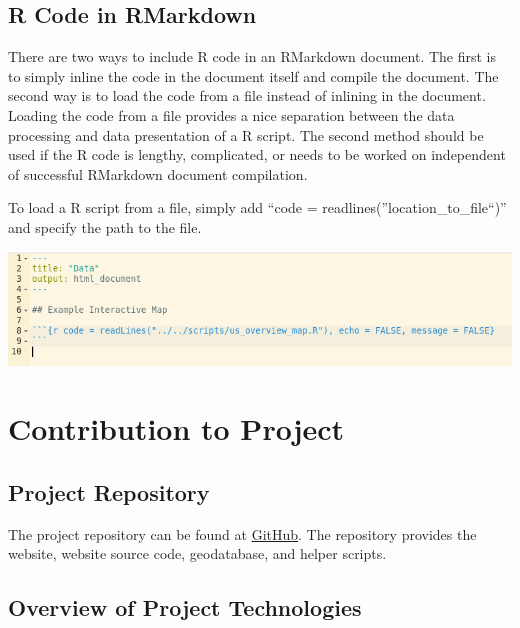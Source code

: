 \documentclass[
]{book}
\begin{document}
\hypertarget{r-code-in-rmarkdown}{%
\section{R Code in RMarkdown}\label{r-code-in-rmarkdown}}

There are two ways to include R code in an RMarkdown document. The first is to simply inline the code in the document itself and compile the document. The second way is to load the code from a file instead of inlining in the document. Loading the code from a file provides a nice separation between the data processing and data presentation of a R script. The second method should be used if the R code is lengthy, complicated, or needs to be worked on independent of successful RMarkdown document compilation.

To load a R script from a file, simply add ``code = readlines(''location\_to\_file``)'' and specify the path to the file.

\includegraphics{images/04-example2_3.png}

\hypertarget{contribution-to-project}{%
\chapter{Contribution to Project}\label{contribution-to-project}}

\hypertarget{project-repository}{%
\section{Project Repository}\label{project-repository}}

The project repository can be found at \href{https://github.com/Peter-Kedron/COVID-19-Digital-Contact-Tracing-and-Geospatial-Technologies-and-Privacy}{GitHub}. The repository provides the website, website source code, geodatabase, and helper scripts.

\hypertarget{overview-of-project-technologies}{%
\section{Overview of Project Technologies}\label{overview-of-project-technologies}}
\end{document}
